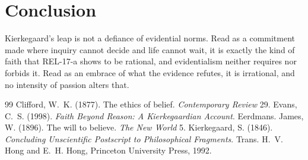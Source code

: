 \documentclass{situationist-preprint}
\begin{document}
\section{Conclusion}

Kierkegaard's leap is not a defiance of evidential norms. Read as a commitment made where inquiry cannot decide and life cannot wait, it is exactly the kind of faith that REL-17-a shows to be rational, and evidentialism neither requires nor forbids it. Read as an embrace of what the evidence refutes, it is irrational, and no intensity of passion alters that.

\begin{thebibliography}{99}\small
{} Clifford, W.~K. (1877). The ethics of belief. \emph{Contemporary Review} 29.
 Evans, C.~S. (1998). \emph{Faith Beyond Reason: A Kierkegaardian Account}. Eerdmans.
 James, W. (1896). The will to believe. \emph{The New World} 5.
 Kierkegaard, S. (1846). \emph{Concluding Unscientific Postscript to Philosophical Fragments}. Trans. H.~V. Hong and E.~H. Hong, Princeton University Press, 1992.
\end{thebibliography}
\end{document}
